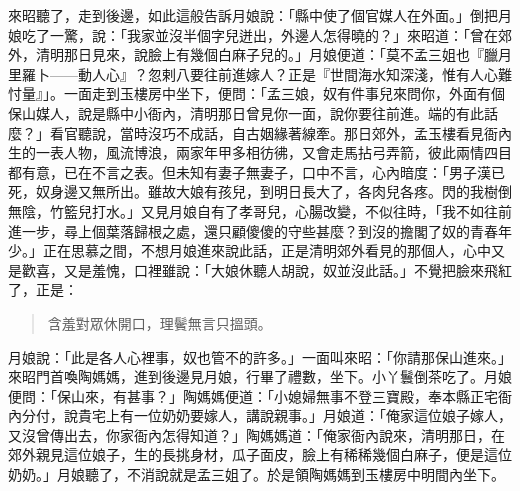 來昭聽了，走到後邊，如此這般告訴月娘說：「縣中使了個官媒人在外面。」倒把月娘吃了一驚，說：「我家並沒半個字兒迸出，外邊人怎得曉的？」來昭道：「曾在郊外，清明那日見來，說臉上有幾個白麻子兒的。」月娘便道：「莫不孟三姐也『臘月里羅卜——動人心』？忽剌八要往前進嫁人？正是『世間海水知深淺，惟有人心難忖量』」。一面走到玉樓房中坐下，便問：「孟三娘，奴有件事兒來問你，外面有個保山媒人，說是縣中小衙內，清明那日曾見你一面，說你要往前進。端的有此話麼？」看官聽說，當時沒巧不成話，自古姻緣著線牽。那日郊外，孟玉樓看見衙內生的一表人物，風流博浪，兩家年甲多相彷彿，又會走馬拈弓弄箭，彼此兩情四目都有意，已在不言之表。但未知有妻子無妻子，口中不言，心內暗度：「男子漢已死，奴身邊又無所出。雖故大娘有孩兒，到明日長大了，各肉兒各疼。閃的我樹倒無陰，竹籃兒打水。」又見月娘自有了孝哥兒，心腸改變，不似往時，「我不如往前進一步，尋上個葉落歸根之處，還只顧傻傻的守些甚麼？到沒的擔閣了奴的青春年少。」正在思慕之間，不想月娘進來說此話，正是清明郊外看見的那個人，心中又是歡喜，又是羞愧，口裡雖說：「大娘休聽人胡說，奴並沒此話。」不覺把臉來飛紅了，正是：
\begin{quote}
含羞對眾休開口，理鬢無言只搵頭。
\end{quote}

月娘說：「此是各人心裡事，奴也管不的許多。」一面叫來昭：「你請那保山進來。」來昭門首喚陶媽媽，進到後邊見月娘，行畢了禮數，坐下。小丫鬟倒茶吃了。月娘便問：「保山來，有甚事？」陶媽媽便道：「小媳婦無事不登三寶殿，奉本縣正宅衙內分付，說貴宅上有一位奶奶要嫁人，講說親事。」月娘道：「俺家這位娘子嫁人，又沒曾傳出去，你家衙內怎得知道？」陶媽媽道：「俺家衙內說來，清明那日，在郊外親見這位娘子，生的長挑身材，瓜子面皮，臉上有稀稀幾個白麻子，便是這位奶奶。」月娘聽了，不消說就是孟三姐了。於是領陶媽媽到玉樓房中明間內坐下。

